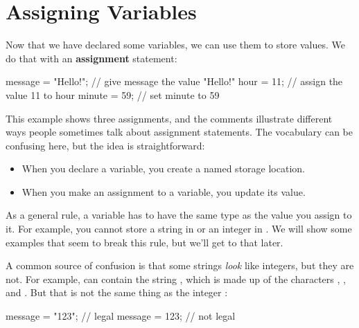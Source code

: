 

\section{Assigning Variables}


Now that we have declared some variables, we can use them to store values.
We do that with an {\bf assignment} statement:

\begin{code}
message = "Hello!";  // give message the value "Hello!"
hour = 11;           // assign the value 11 to hour
minute = 59;         // set minute to 59
\end{code}

This example shows three assignments, and the comments illustrate different ways people sometimes talk about assignment statements.
The vocabulary can be confusing here, but the idea is straightforward:

\begin{itemize}
\item When you declare a variable, you create a named storage location.
\item When you make an assignment to a variable, you update its value.
\end{itemize}

As a general rule, a variable has to have the same type as the value you assign to it.
For example, you cannot store a string in  or an integer in .
We will show some examples that seem to break this rule, but we'll get to that later.


A common source of confusion is that some strings {\em look} like integers, but they are not.
For example,  can contain the string , which is made up of the characters , , and .
But that is not the same thing as the integer :

\begin{code}
message = "123";     // legal
message = 123;       // not legal
\end{code}

